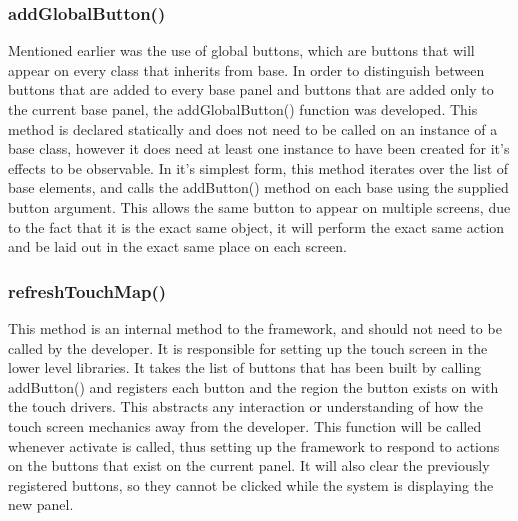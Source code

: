 \subsubsection{addGlobalButton()}

Mentioned earlier was the use of global buttons, which are buttons that will appear on every class that inherits from base. In order to distinguish between buttons that are added to every base panel and buttons that are added only to the current base panel, the addGlobalButton() function was developed. This method is declared statically and does not need to be called on an instance of a base class, however it does need at least one instance to have been created for it's effects to be observable. In it's simplest form, this method iterates over the list of base elements, and calls the addButton() method on each base using the supplied button argument. This allows the same button to appear on multiple screens, due to the fact that it is the exact same object, it will perform the exact same action and be laid out in the exact same place on each screen.

\subsubsection{refreshTouchMap()}

This method is an internal method to the framework, and should not need to be called by the developer. It is responsible for setting up the touch screen in the lower level libraries. It takes the list of buttons that has been built by calling addButton() and registers each button and the region the button exists on with the touch drivers. This abstracts any interaction or understanding of how the touch screen mechanics away from the developer. This function will be called whenever activate is called, thus setting up the framework to respond to actions on the buttons that exist on the current panel. It will also clear the previously registered buttons, so they cannot be clicked while the system is displaying the new panel.

